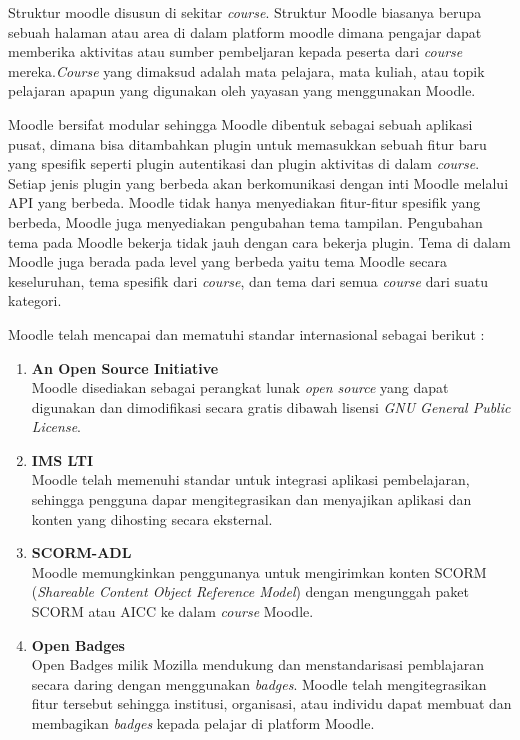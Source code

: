 Struktur moodle disusun di sekitar \textit{course}. Struktur Moodle biasanya berupa sebuah halaman atau area di dalam platform moodle dimana pengajar dapat memberika aktivitas atau sumber pembeljaran kepada peserta dari \textit{course} mereka.\textit{Course} yang dimaksud adalah mata pelajara, mata kuliah, atau topik pelajaran apapun yang digunakan oleh yayasan yang menggunakan Moodle. 

Moodle bersifat modular sehingga Moodle dibentuk sebagai sebuah aplikasi pusat, dimana bisa ditambahkan plugin untuk memasukkan sebuah fitur baru yang spesifik seperti plugin autentikasi dan plugin aktivitas di dalam \textit{course}. Setiap jenis plugin yang berbeda akan berkomunikasi dengan inti Moodle melalui API yang berbeda. Moodle tidak hanya menyediakan fitur-fitur spesifik yang berbeda, Moodle juga menyediakan pengubahan tema tampilan. Pengubahan tema pada Moodle bekerja tidak jauh dengan cara bekerja plugin. Tema di dalam Moodle juga berada pada level yang berbeda yaitu tema Moodle secara keseluruhan, tema spesifik dari \textit{course}, dan tema dari semua \textit{course} dari suatu kategori. \cite{moodle:dev}

Moodle telah mencapai dan mematuhi standar internasional sebagai berikut : \cite{moodle:39}
		\begin{enumerate}
			\item \textbf{An Open Source Initiative} \\
				Moodle disediakan sebagai perangkat lunak \textit{open source} yang dapat digunakan dan dimodifikasi secara gratis dibawah lisensi \textit{GNU General Public License}.
			\item \textbf{IMS LTI\texttrademark} \\
				Moodle telah memenuhi standar untuk integrasi aplikasi pembelajaran, sehingga pengguna dapar mengitegrasikan dan menyajikan aplikasi dan konten yang dihosting secara eksternal.
			\item \textbf{SCORM-ADL} \\
				Moodle memungkinkan penggunanya untuk mengirimkan konten SCORM (\textit{Shareable Content Object Reference Model}) dengan mengunggah paket SCORM atau AICC ke dalam \textit{course} Moodle.
	
			\item \textbf{Open Badges} \\
				Open Badges milik Mozilla mendukung dan menstandarisasi pemblajaran secara daring dengan menggunakan \textit{badges}. Moodle telah mengitegrasikan fitur tersebut sehingga institusi, organisasi, atau individu dapat membuat dan membagikan \textit{badges} kepada pelajar di platform Moodle.
		\end{enumerate}

